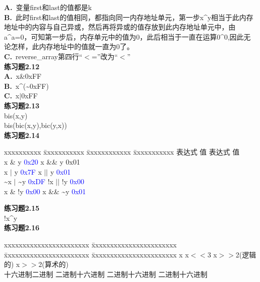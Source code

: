 \documentclass{article}
\begin{document}
\begin{CJK}{UTF8}{uyhei}
\textbf{A.}\  变量first和last的值都是k	\\
\textbf{B.}\ 此时first和last的值相同，都指向同一内存地址单元，第一步x\^{}y相当于此内存地址中的内容与自己异或，然后再将异或的值存放到此内存地址单元中，由a\^{}a=0，可知第一步后，内存单元中的值为0，此后相当于一直在运算0\^{}0,因此无论怎样，此内存地址中的值就一直为0了。\\
\textbf{C.}\ reverse\_array第四行``$<$=''改为``$<$'' \\[2ex]
\textbf{练习题2.12}	\\
\textbf{A.}\ x\&0xFF	\\
\textbf{B.}\ x\^{}(\~{}0xFF)	\\
\textbf{C.}\ x$|$0xFF	\\[2ex]
\textbf{练习题2.13}\\
bis(x,y)\\
bis(bic(x,y),bic(y,x))\\[3ex]
\textbf{练习题2.14}
\begin{tabbing}
	xxxxxxxxxx	\=	xxxxxxxxxxx	\=	xxxxxxxxxxxx	\=	xxxxxxxxxxx	\kill
	表达式		\>	值		\>	表达式	\>	值	\\[1ex]
	x \& y		\>	\textcolor{blue}{0x20}		\>	x \&\& y	\>	0x01	\\[1ex]
	x $|$ y		\>	\textcolor{blue}{0x7F}		\>	x $|$$|$ y	\>	\textcolor{blue}{0x01}		\\[1ex]
	\~{}x $|$ \~{}y	\>	\textcolor{blue}{0xDF}		\>	!x $|$$|$ !y	\>	\textcolor{blue}{0x00}	\\[1ex]
	x \& !y		\>	\textcolor{blue}{0x00}		\>	x \&\& \~{}y	\>	\textcolor{blue}{0x01}	\\[1ex]
\end{tabbing}
\textbf{练习题2.15}\\
!x\^{}y \\[3ex]
\textbf{练习题2.16}
\begin{tabbing}
	xxxxxxxxxxxxxxxxxxxxxxx	\=	xxxxxxxxxxxxxxxxxxxxxxx	\=	xxxxxxxxxxxxxxxxxxxxxxx	\=	xxxxxxxxxxxxxxxxxxxxxxx	\kill
	\hspace{4em}x		\>	\hspace{2em} x$<<$3		\>		\hspace{2em}x$>>$2(逻辑的)	\>		\hspace{2em} x$>>$2(算术的)	\\
	十六进制\hspace{2em}二进制	\>	二进制\hspace{2em}十六进制\>	二进制\hspace{2em}十六进制\>	二进制\hspace{2em}十六进制\\[2ex]

\end{tabbing}
\end{CJK}
\end{document}
